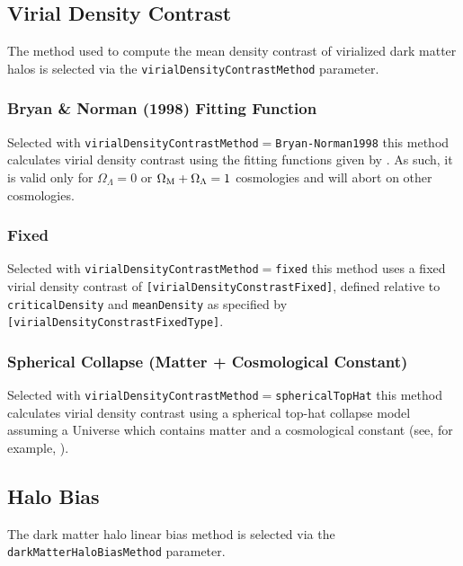 \subsection{Virial Density Contrast}\label{sec:VirialDensityConstrast}

The method used to compute the mean density contrast of virialized dark matter halos is selected via the {\tt virialDensityContrastMethod} parameter.

\subsubsection{Bryan \& Norman (1998) Fitting Function}

Selected with {\tt virialDensityContrastMethod}$=${\tt Bryan-Norman1998} this method calculates virial density contrast using the fitting functions given by \cite{bryan_statistical_1998}. As such, it is valid only for $\Omega_\Lambda=0$ or $\Omega_{\rm M}+\Omega_\Lambda=1$ cosmologies and will abort on other cosmologies.

\subsubsection{Fixed}

Selected with {\tt virialDensityContrastMethod}$=${\tt fixed} this method uses a fixed virial density contrast of {\tt [virialDensityConstrastFixed]}, defined relative to {\tt criticalDensity} and {\tt meanDensity} as specified by {\tt [virialDensityConstrastFixedType]}.

\subsubsection{Spherical Collapse (Matter + Cosmological Constant)}

Selected with {\tt virialDensityContrastMethod}$=${\tt sphericalTopHat} this method calculates virial density contrast using a spherical top-hat collapse model assuming a Universe which contains matter and a cosmological constant (see, for example, \citealt{percival_cosmological_2005}).

\subsection{Halo Bias}

The dark matter halo linear bias method is selected via the {\tt darkMatterHaloBiasMethod} parameter.

